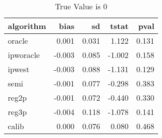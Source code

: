 \begin{table}[h!]

\caption{True Value is 0}
\centering
\begin{tabular}[t]{lrrrr}
\toprule
algorithm & bias & sd & tstat & pval\\
\midrule
oracle & 0.001 & 0.031 & 1.122 & 0.131\\
ipworacle & -0.003 & 0.085 & -1.002 & 0.158\\
ipwest & -0.003 & 0.088 & -1.131 & 0.129\\
semi & -0.001 & 0.077 & -0.298 & 0.383\\
reg2p & -0.001 & 0.072 & -0.440 & 0.330\\
\addlinespace
reg3p & -0.004 & 0.118 & -1.078 & 0.141\\
calib & 0.000 & 0.076 & 0.080 & 0.468\\
\bottomrule
\end{tabular}
\end{table}
